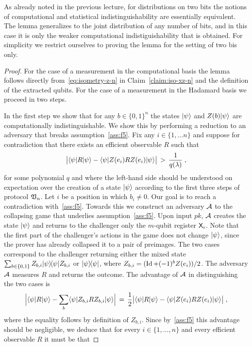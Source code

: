 As already noted in the previous lecture, for distributions on two bits the notions of computational and statistical indistinguishability are essentially equivalent. The lemma generalizes to the joint distribution of any number of bits, and in this case it is only the weaker computational indistiguishability that is obtained. For simplicity we restrict ourselves to proving the lemma for the setting of two bis only. 

\begin{proof}
For the case of a measurement in the computational basis the lemma follows directly from~\eqref{eq:isometry-z-n} in Claim~\ref{claim:iso-xz-n} and the definition of the extracted qubits. 
For the case of a measurement in the Hadamard basis we proceed in two steps. 

In the first step we show that for any $b\in\{0,1\}^n$ the states $|\psi\rangle$ and $Z(b)|\psi\rangle$ are computationally indistinguishable. We show this by performing a reduction to an adversary that breaks assumption~\ref{ass:f5}. Fix any $i\in\{1,\ldots n\}$ and suppose for contradiction that there exists an efficient observable $R$ such that 
\[ \big|\langle\psi| R |\psi\rangle -  \langle\psi| Z(e_i) R Z(e_i) |\psi\rangle \big| \,>\, \frac{1}{q(\lambda)}\;,\]
for some polynomial $q$ and where the left-hand side should be understood on expectation over the creation of a state $|\psi\rangle$ according to the first three steps of protocol $\mathfrak{V}_n$. Let $i$ be a position in which $b_i\neq 0$. Our goal is to reach a contradiction with~\ref{ass:f5}. Towards this we construct an adversary $\mathcal{A}$ to the collapsing game that underlies assumption~\ref{ass:f5}. Upon input $pk$, $\mathcal{A}$ creates the state $|\psi\rangle$ and returns to the challenger only the $m$-qubit register ${\textsf{X}}_i$. Note that the first part of the challenger's actions in the game does not change $|\psi\rangle$, since the prover has already collapsed it to a pair of preimages. The two cases correspond to the challenger returning either the mixed state $\sum_{b\in\{0,1\}} Z_{b,i} |\psi\rangle\!\langle\psi| Z_{b,i}$ or $|\psi\rangle\!\langle\psi|$, where $Z_{b,i}= (\mathop{\rm Id}\nolimits + (-1)^{b} Z(e_i))/2$. The adversary $\mathcal{A}$ measures $R$ and returns the outcome. The advantage of $\mathcal{A}$ in distinguishing the two cases is 
\[ \Big| \langle\psi| R |\psi\rangle - \sum_b  \langle\psi| Z_{b,i} R Z_{b,i} |\psi\rangle\Big| \,=\, \frac{1}{2}\big|  \langle\psi| R |\psi\rangle - \langle\psi| Z(e_i) R Z(e_i)|\psi\rangle\big|\;,\]
where the equality follows by definition of $Z_{b,i}$. 
Since by~\ref{ass:f5} this advantage should be negligible, we deduce that for every $i\in\{1,\ldots,n\}$ and every efficient observable $R$ it must be that 

\end{proof}
